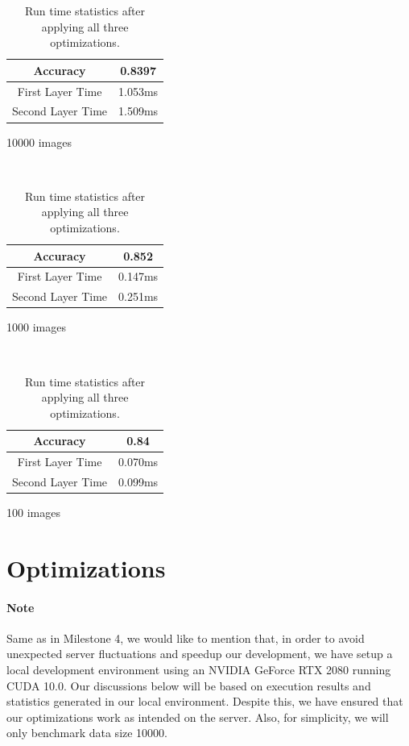 \documentclass{article}
\begin{document}
\begin{table}[H]
    \centering
    \begin{minipage}{.32\linewidth}
        \begin{tabular}{c|c}
            Accuracy & 0.8397 \\ \hline
            First Layer Time & 1.053ms \\ \hline
            Second Layer Time & 1.509ms
        \end{tabular}
        \caption*{10000 images}
    \end{minipage}
    ~
    \begin{minipage}{.32\linewidth}
        \begin{tabular}{c|c}
            Accuracy & 0.852 \\ \hline
            First Layer Time & 0.147ms \\ \hline
            Second Layer Time & 0.251ms
        \end{tabular}
        \caption*{1000 images}
    \end{minipage}
    ~
    \begin{minipage}{.32\linewidth}
        \begin{tabular}{c|c}
            Accuracy & 0.84 \\ \hline
            First Layer Time & 0.070ms \\ \hline
            Second Layer Time & 0.099ms
        \end{tabular}
        \caption*{100 images}
    \end{minipage}
    \caption{Run time statistics after applying all three optimizations.}
\end{table}

\section{Optimizations}

\paragraph{Note}
Same as in Milestone 4, we would like to mention that, in order to avoid unexpected server fluctuations and speedup our development,
we have setup a local development environment using an NVIDIA GeForce RTX 2080 running CUDA 10.0. Our discussions below will be based on
execution results and statistics generated in our local environment. Despite this, we have ensured that our optimizations work as
intended on the server. Also, for simplicity, we will only benchmark data size 10000.
\end{document}
